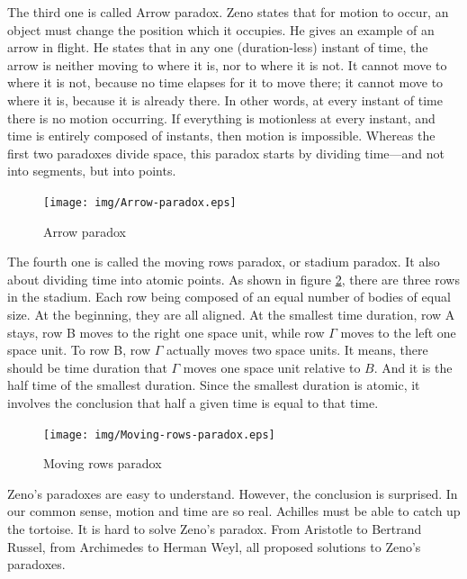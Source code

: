 \documentclass{article}
\begin{document}
The third one is called Arrow paradox. Zeno states that for motion to occur, an object must change the position which it occupies. He gives an example of an arrow in flight. He states that in any one (duration-less) instant of time, the arrow is neither moving to where it is, nor to where it is not. It cannot move to where it is not, because no time elapses for it to move there; it cannot move to where it is, because it is already there. In other words, at every instant of time there is no motion occurring. If everything is motionless at every instant, and time is entirely composed of instants, then motion is impossible. Whereas the first two paradoxes divide space, this paradox starts by dividing time—and not into segments, but into points.

\begin{figure}[htbp]
 \centering
 \texttt{[image: img/Arrow-paradox.eps]}
 \caption{Arrow paradox}
 \label{fig:Arrow-paradox}
\end{figure}

The fourth one is called the moving rows paradox, or stadium paradox. It also about dividing time into atomic points. As shown in figure \ref{fig:Moving-rows-paradox}, there are three rows in the stadium. Each row being composed of an equal number of bodies of equal size. At the beginning, they are all aligned. At the smallest time duration, row A stays, row B moves to the right one space unit, while row $\Gamma$ moves to the left one space unit. To row B, row $\Gamma$ actually moves two space units. It means, there should be time duration that $\Gamma$ moves one space unit relative to $B$. And it is the half time of the smallest duration. Since the smallest duration is atomic, it involves the conclusion that half a given time is equal to that time.

\begin{figure}[htbp]
 \centering
 \texttt{[image: img/Moving-rows-paradox.eps]}
 \caption{Moving rows paradox}
 \label{fig:Moving-rows-paradox}
\end{figure}

Zeno's paradoxes are easy to understand. However, the conclusion is surprised. In our common sense, motion and time are so real. Achilles must be able to catch up the tortoise. It is hard to solve Zeno's paradox. From Aristotle to Bertrand Russel, from Archimedes to Herman Weyl, all proposed solutions to Zeno's paradoxes\cite{Wikipedia-Zeno}.
\end{document}

